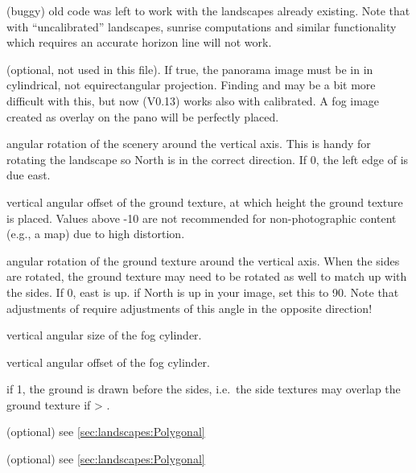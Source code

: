 \begin{description}
  (buggy) old code was left to work with the landscapes already
  existing. Note that with ``uncalibrated'' landscapes, sunrise
  computations and similar functionality which requires an accurate
  horizon line will not work.
\item[\var{tan\_mode}] (optional, not used in this file). If true, the
  panorama image must be in in cylindrical, not equirectangular
  projection. Finding  and
   may be a bit more difficult with this, but
  now (V0.13) works also with calibrated. A fog image created as
  overlay on the pano will be perfectly placed.
\item[\var{decor\_angle\_rotatez}] angular rotation of the scenery
  around the vertical axis. This is handy for rotating the landscape
  so North is in the correct direction. If 0, the left edge of
   is due east.
\item[\var{ground\_angle\_shift}] vertical angular offset of the
  ground texture, at which height the ground texture is placed. Values
  above -10 are not recommended for non-photographic content (e.g., a
  map) due to high distortion.
\item[\var{ground\_angle\_rotatez}] angular rotation of the ground
  texture around the vertical axis. When the sides are rotated, the
  ground texture may need to be rotated as well to match up with the
  sides. If 0, east is up. if North is up in your image, set this to
  90. Note that adjustments of  require
  adjustments of this angle in the opposite direction!
\item[\var{fog\_alt\_angle}] vertical angular size of the fog cylinder.
\item[\var{fog\_angle\_shift}] vertical angular offset of the fog cylinder.
\item[\var{draw\_ground\_first}] if 1, the ground is drawn before the
  sides, i.e.\ the side textures may overlap the ground texture if
   > .
\item[\var{polygonal\_horizon\_list}] (optional) see \ref{sec:landscapes:Polygonal} %
\item[\var{polygonal\_horizon\_list\_mode}] (optional) see \ref{sec:landscapes:Polygonal}  %

\end{description}
